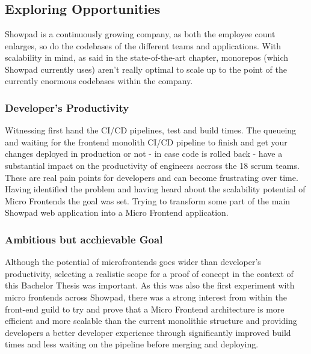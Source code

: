 
\chapter{}
\label{ch:methodologie}

\section{Exploring Opportunities}
Showpad is a continuously growing company, as both the employee count enlarges, so do the codebases of the different teams and applications. With scalability in mind, as said in the state-of-the-art chapter, monorepos (which Showpad currently uses) aren’t really optimal to scale up to the point of the currently enormous codebases within the company. 
\subsection{Developer's Productivity}
Witnessing first hand the CI/CD pipelines, test and build times. The queueing  and waiting for the frontend monolith CI/CD pipeline to finish and get your changes deployed in production or not - in case code is rolled back - have a substantial impact on the productivity of engineers accross the 18 scrum teams. These are real pain points for developers and can become frustrating over time. Having identified the problem and having heard about the scalability potential of Micro Frontends the goal was set. Trying to transform some part of the main Showpad web application into a Micro Frontend application.
\subsection{Ambitious but acchievable Goal}
Although the potential of microfrontends goes wider than developer's productivity, selecting a realistic scope for a proof of concept in the context of this Bachelor Thesis was important. As this was also the first experiment with micro frontends across Showpad, there was a strong interest from within the front-end guild to try and prove that a Micro Frontend architecture is more efficient and more scalable than the current monolithic structure and providing developers a better developer experience through significantly improved build times and less waiting on the pipeline before merging and deploying.
